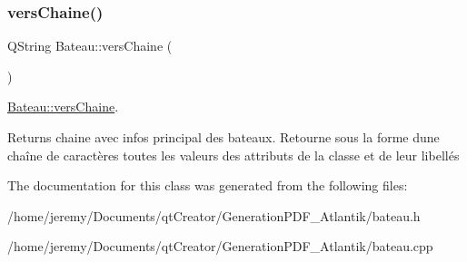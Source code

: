 \subsubsection{\texorpdfstring{vers\+Chaine()}{versChaine()}}
{\footnotesize\ttfamily Q\+String Bateau\+::vers\+Chaine (\begin{DoxyParamCaption}{ }\end{DoxyParamCaption})}



\hyperlink{class_bateau_a392f6a45649a2a35186dfcd1ca58eddc}{Bateau\+::vers\+Chaine}. 

\begin{DoxyReturn}{Returns}
chaine avec infos principal des bateaux. Retourne sous la forme d\textquotesingle{}une chaîne de caractères toutes les valeurs des attributs de la classe et de leur libellés 
\end{DoxyReturn}


The documentation for this class was generated from the following files\+:\begin{DoxyCompactItemize}
\item 
/home/jeremy/\+Documents/qt\+Creator/\+Generation\+P\+D\+F\+\_\+\+Atlantik/bateau.\+h\item 
/home/jeremy/\+Documents/qt\+Creator/\+Generation\+P\+D\+F\+\_\+\+Atlantik/bateau.\+cpp\end{DoxyCompactItemize}
